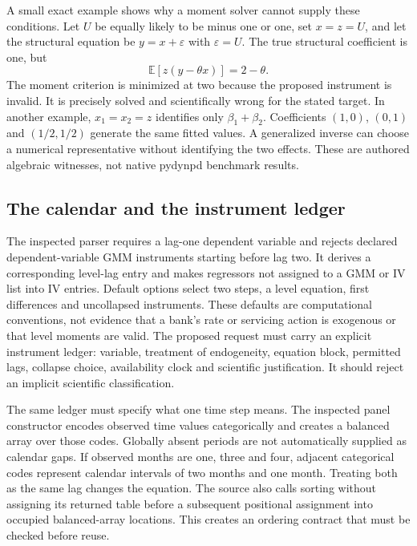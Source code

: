A small exact example shows why a moment solver cannot supply these conditions.
Let $U$ be equally likely to be minus one or one, set $x=z=U$, and let the structural
equation be $y=x+\varepsilon$ with $\varepsilon=U$. The true structural coefficient
is one, but
\begin{equation}
 \mathbb E[z(y-\theta x)]=2-\theta.
\end{equation}
The moment criterion is minimized at two because the proposed instrument is invalid.
It is precisely solved and scientifically wrong for the stated target. In another
example, $x_1=x_2=z$ identifies only $\beta_1+\beta_2$. Coefficients $(1,0)$,
$(0,1)$ and $(1/2,1/2)$ generate the same fitted values. A generalized inverse can
choose a numerical representative without identifying the two effects.
These are authored algebraic witnesses, not native pydynpd benchmark results.
\citep{exec24_pydynpd_reference}

\subsection{The calendar and the instrument ledger}
The inspected parser requires a lag-one dependent variable and rejects declared
dependent-variable GMM instruments starting before lag two. It derives a corresponding
level-lag entry and makes regressors not assigned to a GMM or IV list into IV entries.
Default options select two steps, a level equation, first differences and uncollapsed
instruments. These defaults are computational conventions, not evidence that a bank's
rate or servicing action is exogenous or that level moments are valid. The proposed
request must carry an explicit instrument ledger: variable, treatment of endogeneity,
equation block, permitted lags, collapse choice, availability clock and scientific
justification. It should reject an implicit scientific classification.
\citep{exec24_pydynpd_source}

The same ledger must specify what one time step means. The inspected panel constructor
encodes observed time values categorically and creates a balanced array over those codes.
Globally absent periods are not automatically supplied as calendar gaps. If observed
months are one, three and four, adjacent categorical codes represent calendar intervals
of two months and one month. Treating both as the same lag changes the equation.
The source also calls sorting without assigning its returned table before a subsequent
positional assignment into occupied balanced-array locations. This creates an ordering
contract that must be checked before reuse.\citep{exec24_pydynpd_source}


